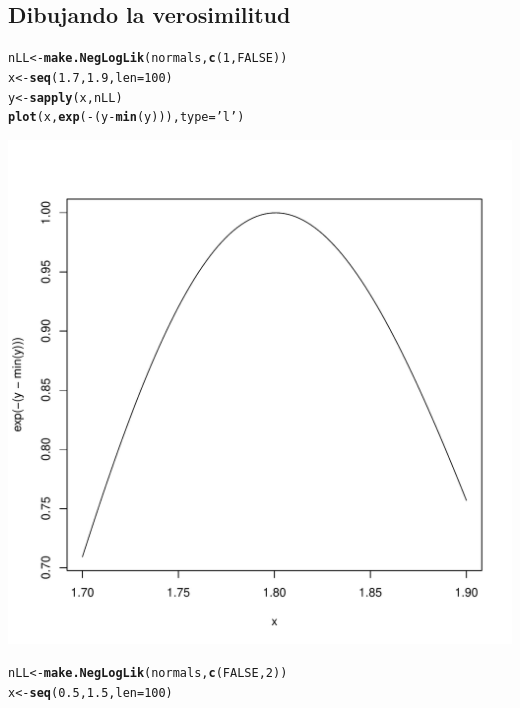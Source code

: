 \documentclass{article}\usepackage[]{graphicx}\usepackage[]{color}
\makeatletter
\def\maxwidth{ %
  \ifdim\Gin@nat@width>\linewidth
    \linewidth
  \else
    \Gin@nat@width
  \fi
}
\newcommand{\hlnum}[1]{\textcolor[rgb]{0.686,0.059,0.569}{#1}}%
\newcommand{\hlstr}[1]{\textcolor[rgb]{0.192,0.494,0.8}{#1}}%
\newcommand{\hlopt}[1]{\textcolor[rgb]{0,0,0}{#1}}%
\newcommand{\hlstd}[1]{\textcolor[rgb]{0.345,0.345,0.345}{#1}}%
\newcommand{\hlkwb}[1]{\textcolor[rgb]{0.69,0.353,0.396}{#1}}%
\newcommand{\hlkwc}[1]{\textcolor[rgb]{0.333,0.667,0.333}{#1}}%
\newcommand{\hlkwd}[1]{\textcolor[rgb]{0.737,0.353,0.396}{\textbf{#1}}}%
\newenvironment{kframe}{%
 \def\at@end@of@kframe{}%
 \ifinner\ifhmode%
  \def\at@end@of@kframe{\end{minipage}}%
  \begin{minipage}{\columnwidth}%
 \fi\fi%
 \def\FrameCommand##1{\hskip\@totalleftmargin \hskip-\fboxsep
 \colorbox{shadecolor}{##1}\hskip-\fboxsep
     \hskip-\linewidth \hskip-\@totalleftmargin \hskip\columnwidth}%
 \MakeFramed {\advance\hsize-\width
   \@totalleftmargin\z@ \linewidth\hsize
   \@setminipage}}%
 {\par\unskip\endMakeFramed%
 \at@end@of@kframe}
\newenvironment{knitrout}{}{} %
\makeatother
\begin{document}
  \subsection{Dibujando la verosimilitud}
\begin{knitrout}
\color{fgcolor}\begin{kframe}
\begin{alltt}
\hlstd{nLL} \hlkwb{<-} \hlkwd{make.NegLogLik}\hlstd{(normals,} \hlkwd{c}\hlstd{(}\hlnum{1}\hlstd{,} \hlnum{FALSE}\hlstd{))}
\hlstd{x} \hlkwb{<-} \hlkwd{seq}\hlstd{(}\hlnum{1.7}\hlstd{,} \hlnum{1.9}\hlstd{,} \hlkwc{len} \hlstd{=} \hlnum{100}\hlstd{)}
\hlstd{y} \hlkwb{<-} \hlkwd{sapply}\hlstd{(x, nLL)}
\hlkwd{plot}\hlstd{(x,} \hlkwd{exp}\hlstd{(}\hlopt{-}\hlstd{(y} \hlopt{-} \hlkwd{min}\hlstd{(y))),} \hlkwc{type} \hlstd{=} \hlstr{'l'}\hlstd{)}
\end{alltt}
\end{kframe}
\includegraphics[width=\maxwidth]{figure/unnamed-chunk-87-1} 
\begin{kframe}\begin{alltt}
\hlstd{nLL} \hlkwb{<-} \hlkwd{make.NegLogLik}\hlstd{(normals,} \hlkwd{c}\hlstd{(}\hlnum{FALSE}\hlstd{,} \hlnum{2}\hlstd{))}
\hlstd{x} \hlkwb{<-} \hlkwd{seq}\hlstd{(}\hlnum{0.5}\hlstd{,} \hlnum{1.5}\hlstd{,} \hlkwc{len} \hlstd{=} \hlnum{100}\hlstd{)}

\end{alltt}
\end{kframe}
\end{knitrout}
\end{document}
